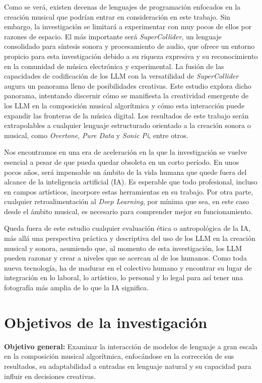 Como se verá, existen decenas de lenguajes de programación enfocados en la creación musical que podrían entrar en consideración en este trabajo. Sin embargo, la investigación se limitará a experimentar con muy pocos de ellos por razones de espacio. El más importante será \textit{SuperCollider}, un lenguaje consolidado para síntesis sonora y procesamiento de audio, que ofrece un entorno propicio para esta investigación debido a su riqueza expresiva y su reconocimiento en la comunidad de música electrónica y experimental. La fusión de las capacidades de codificación de los LLM con la versatilidad de \textit{SuperCollider} augura un panorama lleno de posibilidades creativas. Este estudio explora dicho panorama, intentando discernir cómo se manifiesta la creatividad emergente de los LLM en la composición musical algorítmica y cómo esta interacción puede expandir las fronteras de la música digital. Los resultados de este trabajo serán extrapolables a cualquier lenguaje estructurado orientado a la creación sonora o musical, como \textit{Overtone}, \textit{Pure Data} y \textit{Sonic Pi}, entre otros.

Nos encontramos en una era de aceleración en la que la investigación se vuelve esencial a pesar de que pueda quedar obsoleta en un corto período. En unos pocos años, será impensable un ámbito de la vida humana que quede fuera del alcance de la inteligencia artificial (IA). Es esperable que todo profesional, incluso en campos artísticos, incorpore estas herramientas en su trabajo. Por otra parte, cualquier retroalimentación al \textit{Deep Learning}, por mínima que sea, en este caso desde el ámbito musical, es necesario para comprender mejor su funcionamiento.

Queda fuera de este estudio cualquier evaluación ética o antropológica de la IA, más allá una perspectiva práctica y descriptiva del uso de los LLM en la creación musical y sonora, asumiendo que, al momento de esta investigación, los LLM pueden razonar y crear a niveles que se acercan al de los humanos. Como toda nueva tecnología, ha de madurar en el colectivo humano y encontrar su lugar de integración en lo laboral, lo artístico, lo personal y lo legal para así tener una fotografía más amplia de lo que la IA significa. 


\section{Objetivos de la investigación}

\textbf{Objetivo general:} Examinar la interacción de modelos de lenguaje a gran escala en la composición musical algorítmica, enfocándose en la corrección de sus resultados, su adaptabilidad a entradas en lenguaje natural y su capacidad para influir en decisiones creativas.

